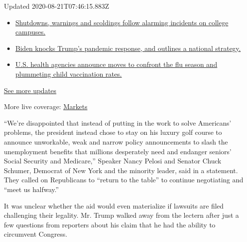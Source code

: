 Updated 2020-08-21T07:46:15.883Z

\begin{itemize}
\tightlist
\item
  \href{https://www.nytimes3xbfgragh.onion/2020/08/20/world/coronavirus-covid.html?action=click\&pgtype=Article\&state=default\&region=MAIN_CONTENT_1\&context=storylines_live_updates\#link-68774d88}{Shutdowns,
  warnings and scoldings follow alarming incidents on college campuses.}
\item
  \href{https://www.nytimes3xbfgragh.onion/2020/08/20/world/coronavirus-covid.html?action=click\&pgtype=Article\&state=default\&region=MAIN_CONTENT_1\&context=storylines_live_updates\#link-26b58724}{Biden
  knocks Trump's pandemic response, and outlines a national strategy.}
\item
  \href{https://www.nytimes3xbfgragh.onion/2020/08/20/world/coronavirus-covid.html?action=click\&pgtype=Article\&state=default\&region=MAIN_CONTENT_1\&context=storylines_live_updates\#link-4e542da3}{U.S.
  health agencies announce moves to confront the flu season and
  plummeting child vaccination rates.}
\end{itemize}

\href{https://www.nytimes3xbfgragh.onion/2020/08/20/world/coronavirus-covid.html?action=click\&pgtype=Article\&state=default\&region=MAIN_CONTENT_1\&context=storylines_live_updates}{See
more updates}

More live coverage:
\href{https://www.nytimes3xbfgragh.onion/live/2020/08/20/business/stock-market-today-coronavirus?action=click\&pgtype=Article\&state=default\&region=MAIN_CONTENT_1\&context=storylines_live_updates}{Markets}

``We're disappointed that instead of putting in the work to solve
Americans' problems, the president instead chose to stay on his luxury
golf course to announce unworkable, weak and narrow policy announcements
to slash the unemployment benefits that millions desperately need and
endanger seniors' Social Security and Medicare,'' Speaker Nancy Pelosi
and Senator Chuck Schumer, Democrat of New York and the minority leader,
said in a statement. They called on Republicans to ``return to the
table'' to continue negotiating and ``meet us halfway.''

It was unclear whether the aid would even materialize if lawsuits are
filed challenging their legality. Mr. Trump walked away from the lectern
after just a few questions from reporters about his claim that he had
the ability to circumvent Congress.


